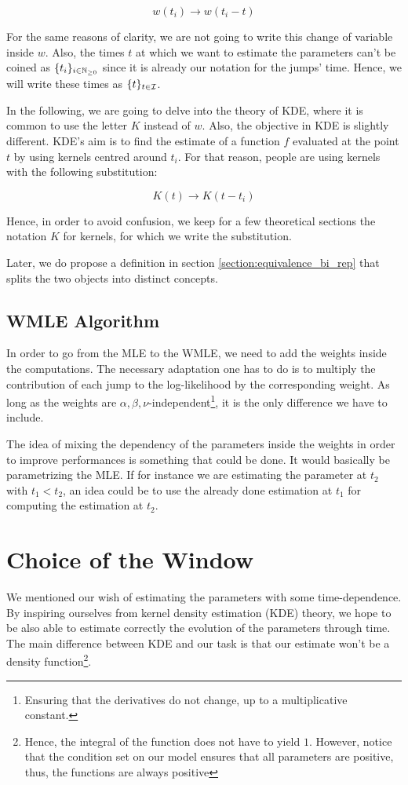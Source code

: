 $$w(t_i) \to w(  t_i - t ) $$

For the same reasons of clarity, we are not going to write this change of variable inside $w$. Also, the times $t$ at which we want to estimate the parameters can't be coined as $\{ t_i \}_{ i \in \mathbb{N}_{\geq 0}}$ since it is already our notation for the jumps' time. Hence, we will write these times as $\{t\}_{t \in \mathcal I}$.

In the following, we are going to delve into the theory of KDE, where it is common to use the letter $K$ instead of $w$. Also, the objective in KDE is slightly different. KDE's aim is to find the estimate of a function $f$ evaluated at the point $t$ by using kernels centred around $t_i$. For that reason, people are using kernels with the following substitution:

$$ K(t) \to K(t - t_i)$$

Hence, in order to avoid confusion, we keep for a few theoretical sections the notation $K$ for kernels, for which we write the substitution. 

Later, we do propose a definition in section \ref{section:equivalence_bi_rep} that splits the two objects into distinct concepts.


\subsection{WMLE Algorithm}
In order to go from the MLE to the WMLE, we need to add the weights inside the computations. The necessary adaptation one has to do is to multiply the contribution of each jump to the log-likelihood by the corresponding weight. As long as the weights are $\alpha, \beta, \nu$-independent\footnote{Ensuring that the derivatives do not change, up to a multiplicative constant.}, it is the only difference we have to include.  

The idea of mixing the dependency of the parameters inside the weights in order to improve performances is something that could be done. It would basically be parametrizing the MLE. If for instance we are estimating the parameter at $t_2$ with $t_1 < t_2$, an idea could be to use the already done estimation at $t_1$ for computing the estimation at $t_2$.



\section{Choice of the Window}

We mentioned our wish of estimating the parameters with some time-dependence. By inspiring ourselves from kernel density estimation (KDE) theory, we hope to be also able to estimate correctly the evolution of the parameters through time. The main difference between KDE and our task is that our estimate won't be a density function\footnote{Hence, the integral of the function does not have to yield $1$. However, notice that the condition set on our model ensures that all parameters are positive, thus, the functions are always positive}. 


